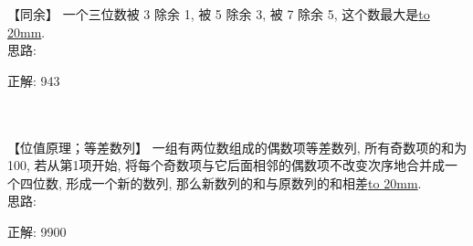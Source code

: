 \item {
    【同余】
    一个三位数被 3 除余 1, 被 5 除余 3, 被 7 除余 5, 这个数最大是\underline{\hbox to 20mm{}}.
    \ifshowSolution
        \fangsong{}
        \\
        思路:

        正解: 943
    \else
        \\ \\ \\
    \fi
}

\item {
    【位值原理；等差数列】
    一组有两位数组成的偶数项等差数列, 所有奇数项的和为100, 若从第1项开始, 将每个奇数项与它后面相邻的偶数项不改变次序地合并成一个四位数, 形成一个新的数列, 那么新数列的和与原数列的和相差\underline{\hbox to 20mm{}}.
    \ifshowSolution
        \fangsong{}
        \\
        思路:

        正解: 9900
    \else
        \\ \\ \\
    \fi
}
